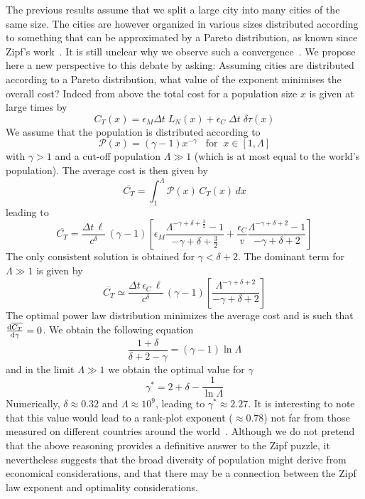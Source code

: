 The previous results assume that we split a large city into many cities of the same size. The cities are however organized in various sizes distributed according to something that can be approximated by a Pareto distribution, as known since Zipf's work~\cite{Zipf:1949}. It is still unclear why we observe such a convergence~\cite{Batty:2006,Cristelli:2012}. We propose here a new perspective to this debate by asking: Assuming cities are distributed according to a Pareto distribution, what value of the exponent minimises the overall cost? Indeed from above the total cost for a population size $x$ is given at large times by
%
\begin{equation}
C_T(x) = \epsilon_M\Delta t \; L_N(x) + \epsilon_C \; \Delta t  \; \delta \tau(x)
\end{equation}
%
We assume that the population is distributed according to 
%
\begin{equation}
\mathcal{P}(x)=(\gamma-1) x^{-\gamma}\;\;\;\text{for}\;\;x\in[1,\Lambda ]
\end{equation}
%
with $\gamma>1$ and a cut-off population $\Lambda \gg 1$ (which is at most equal to the world's population). The average cost is then given by
%
\begin{equation}
\overline{C_T} = \int_1^\Lambda \mathcal{P}(x)\,C_T(x)\,dx
\end{equation}
%
leading to
%
\begin{equation}
\overline{C_T} = \frac{\Delta t\, \ell}{c^\delta}\,\left(\gamma - 1 \right) \left[ \epsilon_M\frac{\Lambda^{-\gamma+\delta+\frac{3}{2}}-1}{-\gamma+\delta+\frac{3}{2}} + \frac{\epsilon_C}{v}\frac{\Lambda^{-\gamma+\delta+2}-1}{-\gamma+\delta+2} \right]
\end{equation}
%
The only consistent solution is obtained for $\gamma < \delta + 2$. The dominant term for $\Lambda \gg 1$ is given by
%
\begin{equation}
\overline{C_T}\simeq \frac{\Delta t\,\epsilon_C\, \ell}{c^\delta}\,\left(\gamma - 1 \right) \left[ \frac{\Lambda^{-\gamma+\delta+2}}{-\gamma+\delta+2} \right]
\end{equation}
%
The optimal power law distribution minimizes the average cost and is such that $\frac{{\rm d} \overline{C_T}}{{\rm d} \gamma} = 0$. We obtain the following equation
%
\begin{equation}
\frac{1+\delta}{\delta+2-\gamma} = \left(\gamma - 1\right) \ln \Lambda
\end{equation}
%
and in the limit $\Lambda \gg 1$ we obtain the optimal value for $\gamma$
%
\begin{equation}
\gamma^* = 2+\delta - \frac{1}{\ln \Lambda}
\end{equation}
%
Numerically, $\delta \approx 0.32$ and $\Lambda \approx 10^{9}$, leading to $\gamma^* \approx 2.27$. It is interesting to note that this value would lead to a rank-plot exponent ($\approx 0.78$) not far from those measured on different countries around the world~\cite{Soo:2005}. Although we do not pretend that the above reasoning provides a definitive answer to the Zipf puzzle, it nevertheless suggests that the broad diversity of population might derive from economical considerations, and that there may be a connection between the Zipf law exponent and optimality considerations.


